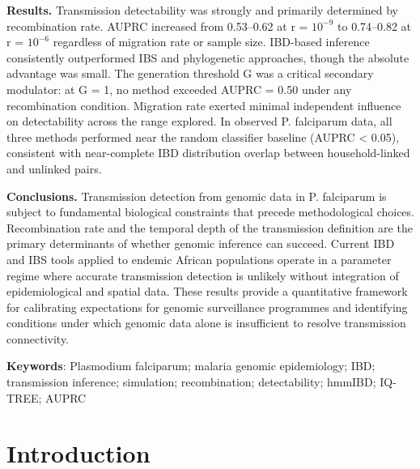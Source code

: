 \documentclass[
  11pt,
]{article}
\begin{document}
\textbf{Results.} Transmission detectability was strongly and primarily
determined by recombination rate. AUPRC increased from 0.53--0.62 at r =
\(10^{-9}\) to 0.74--0.82 at r = \(10^{-6}\) regardless of migration
rate or sample size. IBD-based inference consistently outperformed IBS
and phylogenetic approaches, though the absolute advantage was small.
The generation threshold G was a critical secondary modulator: at G = 1,
no method exceeded AUPRC = 0.50 under any recombination condition.
Migration rate exerted minimal independent influence on detectability
across the range explored. In observed P. falciparum data, all three
methods performed near the random classifier baseline (AUPRC \textless{}
0.05), consistent with near-complete IBD distribution overlap between
household-linked and unlinked pairs.

\textbf{Conclusions.} Transmission detection from genomic data in P.
falciparum is subject to fundamental biological constraints that precede
methodological choices. Recombination rate and the temporal depth of the
transmission definition are the primary determinants of whether genomic
inference can succeed. Current IBD and IBS tools applied to endemic
African populations operate in a parameter regime where accurate
transmission detection is unlikely without integration of
epidemiological and spatial data. These results provide a quantitative
framework for calibrating expectations for genomic surveillance
programmes and identifying conditions under which genomic data alone is
insufficient to resolve transmission connectivity.

\textbf{Keywords}: Plasmodium falciparum; malaria genomic epidemiology;
IBD; transmission inference; simulation; recombination; detectability;
hmmIBD; IQ-TREE; AUPRC

\date{}
\maketitle
\linenumbers

\newpage

\section{\texorpdfstring{\textbf{Introduction}}{Introduction}}\label{introduction}
\end{document}
